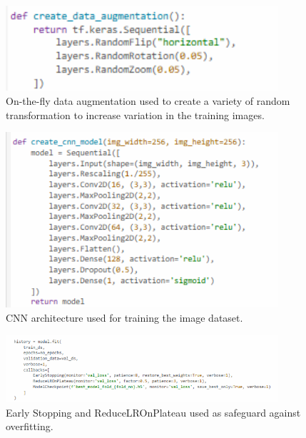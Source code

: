 \begin{figure}[!htbp]
	\centering
	\includegraphics[width=0.9\textwidth, angle=0]{figures/live_augmentation.png}
	\caption{On-the-fly data augmentation used to create a variety of random transformation to increase variation in the training images.}
\end{figure}

\begin{figure}[!htbp]
	\centering
	\includegraphics[width=0.9\textwidth, angle=0]{figures/CNN_layers.png}
	\caption{CNN architecture used for training the image dataset.}
\end{figure}

\begin{figure}[!htbp]
	\centering
	\includegraphics[width=0.9\textwidth, angle=0]{figures/avoid_overfitting.png}
	\caption{Early Stopping and ReduceLROnPlateau used as safeguard against overfitting.}
\end{figure}